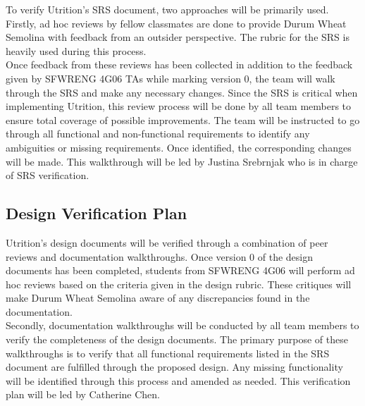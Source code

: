 \documentclass[12pt, titlepage]{article}
\begin{document}
	
	
	To verify Utrition's SRS document, two approaches will be primarily used. Firstly, ad hoc reviews by fellow classmates are done to provide Durum Wheat Semolina with feedback from an outsider perspective. The rubric for the SRS is heavily used during this process. \\
	
	Once feedback from these reviews has been collected in addition to the feedback given by SFWRENG 4G06 TAs while marking version 0, the team will walk through the SRS and make any necessary changes. Since the SRS is critical when implementing Utrition, this review process will be done by all team members to ensure total coverage of possible improvements. The team will be instructed to go through all functional and non-functional requirements to identify any ambiguities or missing requirements. Once identified, the corresponding changes will be made. This walkthrough will be led by Justina Srebrnjak who is in charge of SRS verification.

	\subsection{Design Verification Plan}
	
	
	
	
	Utrition's design documents will be verified through a combination of peer reviews and documentation walkthroughs. Once version 0 of the design documents has been completed, students from SFWRENG 4G06 will perform ad hoc reviews based on the criteria given in the design rubric. These critiques will make Durum Wheat Semolina aware of any discrepancies found in the documentation.\\
	
	Secondly, documentation walkthroughs will be conducted by all team members to verify the completeness of the design documents. The primary purpose of these walkthroughs is to verify that all functional requirements listed in the SRS document are fulfilled through the proposed design. Any missing functionality will be identified through this process and amended as needed. This verification plan will be led by Catherine Chen.
	
\end{document}
